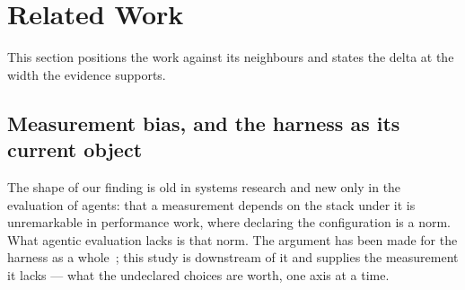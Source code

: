 \section{Related Work}
\label{sec:related}

This section positions the work against its neighbours and states the delta at the width the evidence
supports.

\subsection{Measurement bias, and the harness as its current object}

The shape of our finding is old in systems research and new only in the evaluation of agents: that a
measurement depends on the stack under it is unremarkable in performance work, where declaring the
configuration is a norm. What agentic evaluation lacks is that norm. The argument has been made for the
harness as a whole~\citep{zhang2026harness,yao2026harnessbench}; this study is downstream of it and supplies the
measurement it lacks --- what the undeclared choices are worth, one axis at a time.

